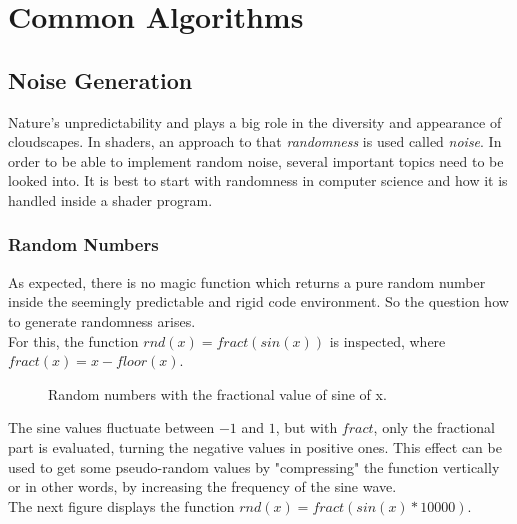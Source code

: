 \section{Common Algorithms}

\subsection{Noise Generation}
\label{section:noise-generation}
Nature's unpredictability and plays a big role in the diversity and appearance of cloudscapes. In shaders, an approach to that \textit{randomness} is used called \textit{\gls{noise}}.
In order to be able to implement random \gls{noise}, several important topics need to be looked into. It is best to start with randomness in computer science and how it is handled inside a shader program.

\subsubsection{Random Numbers}
As expected, there is no magic function which returns a pure random number inside the seemingly predictable and rigid code environment.
So the question how to generate randomness arises. 
\\
For this, the function $rnd(x) = fract(sin(x))$ is inspected, where $fract(x) = x - floor(x)$.

\begin{figure}[H]
    \centering
    \caption{Random numbers with the fractional value of sine of x.}
\end{figure}

\noindent
The sine values fluctuate between $-1$ and $1$, but with $fract$, only the fractional part is evaluated, turning the negative values in positive ones.
This effect can be used to get some pseudo-random values by "compressing" the function vertically or in other words, by increasing the frequency of the sine wave.
\\
The next figure displays the function $rnd(x) = fract(sin(x) * 10000)$.

